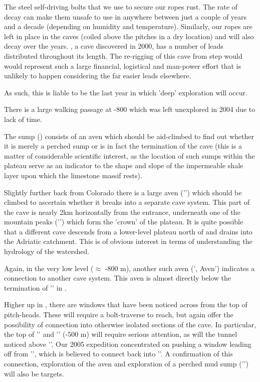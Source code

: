 The steel self-driving bolts that we use to secure our ropes rust. The rate of decay can make them unsafe to use in anywhere between just a couple of years and a decade (depending on humidity and temperature). Similarly, our ropes are left in place in the caves (coiled above the pitches in a dry location) and will also decay over the years. , a cave discovered in 2000, has a number of leads distributed throughout its length. The re-rigging of this cave from step would would represent such a large financial, logistical and man-power effort that is unlikely to happen considering the far easier leads elsewhere.

As such, this is liable to be the last year in which 'deep' exploration will occur.

There is a large walking passage at -800 which was left unexplored in 2004 due to lack of time.

The sump () consists of an aven which should be aid-climbed to find out whether it is merely a perched sump or is in fact the  termination of the cave (this is a matter of considerable scientific interest, as the location of such sumps within the  plateau serve as an indicator to the shape and slope of the impermeable shale layer upon which the limestone massif rests).

Slightly further back from Colorado there is a large aven ('') which should be climbed to ascertain whether it breaks into a separate cave system. This part of the cave is nearly 2km horizontally from the entrance, underneath one of the mountain peaks ('') which form the 'crown' of the plateau. It is quite possible that a different cave descends from a lower-level plateau north of  and drains into the Adriatic catchment. This is of obvious interest in terms of understanding the hydrology of the watershed.

Again, in the very low level ($\approx$ -800 m), another such aven (', Aven') indicates a connection to another cave system. This aven is almost directly below the termination of '' in .

Higher up in , there are windows that have been noticed across from the top of pitch-heads. These will require a bolt-traverse to reach, but again offer the possibility of connection into otherwise isolated sections of the cave. In particular, the top of '' and '' (-500 m) will require serious attention, as will the tunnel noticed above ''.
Our 2005 expedition concentrated on pushing a window leading off from '', which is believed to connect back into ''. A confirmation of this connection, exploration of the  aven and exploration of a perched mud sump ('') will also be targets.

